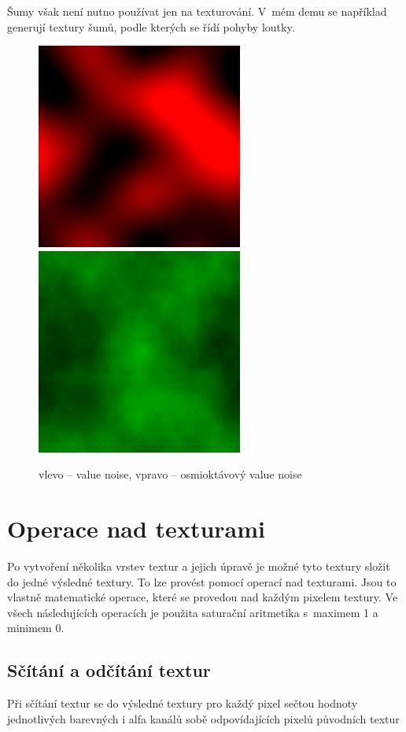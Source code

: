 Šumy však není nutno používat jen na texturování.
V~mém demu se například generují textury šumů, podle kterých se řídí pohyby loutky.
 
\begin{figure}[h]
    \begin{center}
      \includegraphics[scale=0.49]{fig/valueNoiseTex} 
      \includegraphics[scale=0.49]{fig/8octValueNoiseTex} 
      \caption{vlevo -- value noise, vpravo -- osmioktávový value noise} 
      \label{adsrFIG}
    \end{center}
\end{figure}

\section{Operace nad texturami} \label{texturyOp}
Po vytvoření několika vrstev textur a jejich úpravě je možné tyto textury složit do jedné výsledné textury.
To lze provést pomocí operací nad texturami.
Jsou to vlastně matematické operace, které se provedou nad každým pixelem textury.
Ve všech následujících operacích je použita saturační aritmetika s~maximem 1 a minimem 0.
\subsection{Sčítání a odčítání textur}
Při sčítání textur se do výsledné textury pro každý pixel sečtou hodnoty jednotlivých barevných i alfa kanálů sobě odpovídajících pixelů původních textur

